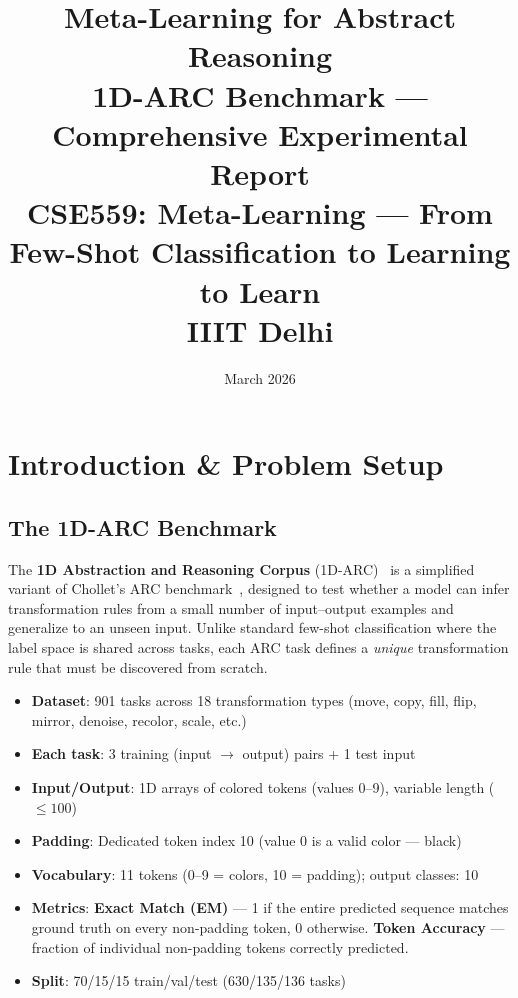 \documentclass[11pt,a4paper]{article}
\title{\textbf{\LARGE Meta-Learning for Abstract Reasoning}\\[6pt]
\Large 1D-ARC Benchmark --- Comprehensive Experimental Report\\[8pt]
\large CSE559: Meta-Learning --- From Few-Shot Classification to Learning to Learn\\IIIT Delhi}
\author{}\date{March 2026}
\begin{document}
\maketitle\thispagestyle{fancy}

\section{Introduction \& Problem Setup}

\subsection{The 1D-ARC Benchmark}
The \textbf{1D Abstraction and Reasoning Corpus} (1D-ARC)~\cite{arc1d} is a simplified variant of Chollet's ARC benchmark~\cite{chollet2019}, designed to test whether a model can infer transformation rules from a small number of input--output examples and generalize to an unseen input. Unlike standard few-shot classification where the label space is shared across tasks, each ARC task defines a \emph{unique} transformation rule that must be discovered from scratch.

\begin{tcolorbox}[colback=blue!3,colframe=blue!40!black,title=\textbf{Task Definition}]
\begin{itemize}[nosep,leftmargin=*]
  \item \textbf{Dataset}: 901 tasks across 18 transformation types (move, copy, fill, flip, mirror, denoise, recolor, scale, etc.)
  \item \textbf{Each task}: 3 training (input $\to$ output) pairs + 1 test input
  \item \textbf{Input/Output}: 1D arrays of colored tokens (values 0--9), variable length ($\leq 100$)
  \item \textbf{Padding}: Dedicated token index 10 (value 0 is a valid color --- black)
  \item \textbf{Vocabulary}: 11 tokens (0--9 = colors, 10 = padding); output classes: 10
  \item \textbf{Metrics}: \textbf{Exact Match (EM)} --- 1 if the entire predicted sequence matches ground truth on every non-padding token, 0 otherwise. \textbf{Token Accuracy} --- fraction of individual non-padding tokens correctly predicted.
  \item \textbf{Split}: 70/15/15 train/val/test (630/135/136 tasks)
\end{itemize}
\end{tcolorbox}
\end{document}

